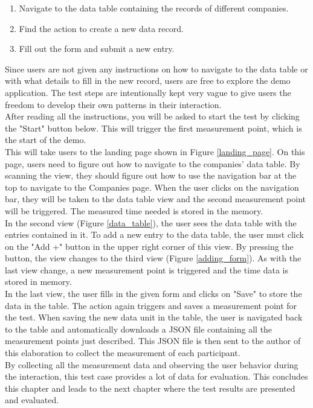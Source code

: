 \begin{enumerate}
    \item Navigate to the data table containing the records of different companies.
    \item Find the action to create a new data record.
    \item Fill out the form and submit a new entry.
\end{enumerate}

Since users are not given any instructions on how to navigate to the data table or with what details to fill in the new record, users are free to explore the demo application. The test steps are intentionally kept very vague to give users the freedom to develop their own patterns in their interaction. \\
After reading all the instructions, you will be asked to start the test by clicking the "Start" button below. This will trigger the first measurement point, which is the start of the demo. \\
This will take users to the landing page shown in Figure \ref{landing_page}. On this page, users need to figure out how to navigate to the companies' data table. By scanning the view, they should figure out how to use the navigation bar at the top to navigate to the Companies page. When the user clicks on the navigation bar, they will be taken to the data table view and the second measurement point will be triggered. The measured time needed is stored in the memory. \\
In the second view (Figure \ref{data_table}), the user sees the data table with the entries contained in it. To add a new entry to the data table, the user must click on the "Add +" button in the upper right corner of this view. By pressing the button, the view changes to the third view (Figure \ref{adding_form}). As with the last view change, a new measurement point is triggered and the time data is stored in memory. \\ 
In the last view, the user fills in the given form and clicks on "Save" to store the data in the table. The action again triggers and saves a measurement point for the test. When saving the new data unit in the table, the user is navigated back to the table and automatically downloads a JSON file containing all the measurement points just described. This JSON file is then sent to the author of this elaboration to collect the measurement of each participant. \\

By collecting all the measurement data and observing the user behavior during the interaction, this test case provides a lot of data for evaluation. This concludes this chapter and leads to the next chapter where the test results are presented and evaluated.
